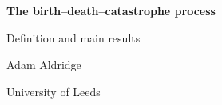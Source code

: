 \documentclass[11pt]{report}
\begin{document}
\hypersetup{pageanchor=false}
\begin{titlepage}
\centering
\vspace*{4cm}
{\LARGE\bfseries The birth--death--catastrophe process\par}
\vspace{6pt}
{\large Definition and main results\par}
\vspace{2.5cm}
{\large Adam Aldridge\par}
\vspace{4pt}
{University of Leeds\par}
\end{titlepage}
\hypersetup{pageanchor=true}

\begingroup
\setlength{\parskip}{0pt}
\tableofcontents
\endgroup
\clearpage

\setcounter{chapter}{3}


\FloatBarrier
\begingroup
\footnotesize
\makeatletter
\let\@oldbibliography\thebibliography
\renewcommand{\thebibliography}[1]{\@oldbibliography{#1}%
  \setlength{\itemsep}{0pt plus 0.3pt}\setlength{\parsep}{0pt}}
\makeatother


\endgroup
\end{document}
